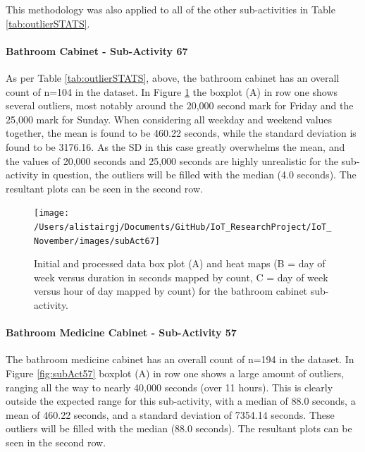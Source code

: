\documentclass[11pt,]{article}
\let\oldparagraph\paragraph
\renewcommand{\paragraph}[1]{\oldparagraph{#1}\mbox{}}
\begin{document}
This methodology was also applied to all of the other sub-activities in
Table \ref{tab:outlierSTATS}.

\hypertarget{bathroom-cabinet---sub-activity-67}{%
\paragraph{Bathroom Cabinet - Sub-Activity
67}\label{bathroom-cabinet---sub-activity-67}}

As per Table \ref{tab:outlierSTATS}, above, the bathroom cabinet has an
overall count of n=104 in the dataset. In Figure \ref{fig:subAct67} the
boxplot (A) in row one shows several outliers, most notably around the
20,000 second mark for Friday and the 25,000 mark for Sunday. When
considering all weekday and weekend values together, the mean is found
to be 460.22 seconds, while the standard deviation is found to be
3176.16. As the SD in this case greatly overwhelms the mean, and the
values of 20,000 seconds and 25,000 seconds are highly unrealistic for
the sub-activity in question, the outliers will be filled with the
median (4.0 seconds). The resultant plots can be seen in the second row.

\begin{figure}[H]

{\centering \texttt{[image: /Users/alistairgj/Documents/GitHub/IoT\_ResearchProject/IoT\_November/images/subAct67]} 

}

\caption{Initial and processed data box plot (A) and heat maps (B = day of week versus duration in seconds mapped by count, C = day of week versus hour of day mapped by count) for the bathroom cabinet sub-activity.}\label{fig:subAct67}
\end{figure}

\hypertarget{bathroom-medicine-cabinet---sub-activity-57}{%
\paragraph{Bathroom Medicine Cabinet - Sub-Activity
57}\label{bathroom-medicine-cabinet---sub-activity-57}}

The bathroom medicine cabinet has an overall count of n=194 in the
dataset. In Figure \ref{fig:subAct57} boxplot (A) in row one shows a
large amount of outliers, ranging all the way to nearly 40,000 seconds
(over 11 hours). This is clearly outside the expected range for this
sub-activity, with a median of 88.0 seconds, a mean of 460.22 seconds,
and a standard deviation of 7354.14 seconds. These outliers will be
filled with the median (88.0 seconds). The resultant plots can be seen
in the second row.
\end{document}

